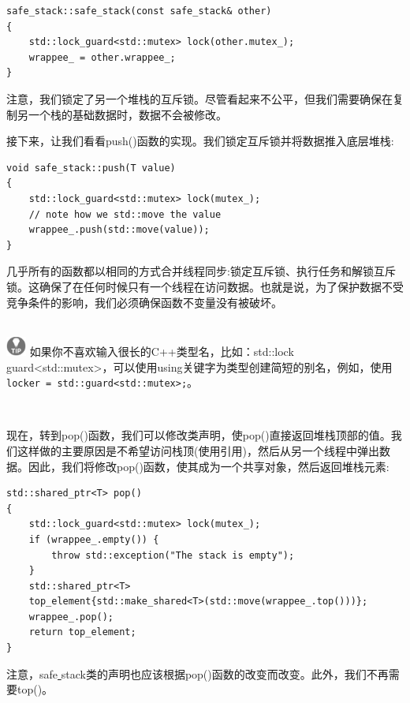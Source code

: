 \begin{lstlisting}[caption={}]
safe_stack::safe_stack(const safe_stack& other)
{
	std::lock_guard<std::mutex> lock(other.mutex_);
	wrappee_ = other.wrappee_;
}
\end{lstlisting}

注意，我们锁定了另一个堆栈的互斥锁。尽管看起来不公平，但我们需要确保在复制另一个栈的基础数据时，数据不会被修改。 \par
接下来，让我们看看push()函数的实现。我们锁定互斥锁并将数据推入底层堆栈: \par

\begin{lstlisting}[caption={}]
void safe_stack::push(T value)
{
	std::lock_guard<std::mutex> lock(mutex_);
	// note how we std::move the value
	wrappee_.push(std::move(value));
}
\end{lstlisting}

几乎所有的函数都以相同的方式合并线程同步:锁定互斥锁、执行任务和解锁互斥锁。这确保了在任何时候只有一个线程在访问数据。也就是说，为了保护数据不受竞争条件的影响，我们必须确保函数不变量没有被破坏。 \par

\hspace*{\fill} \\ %
\includegraphics[width=0.05\textwidth]{images/tip}
如果你不喜欢输入很长的C++类型名，比如：std::lock\underline{ }guard<std::mutex>，可以使用using关键字为类型创建简短的别名，例如，使用\texttt{locker = std::guard<std::mutex>;}。 \par
\noindent\textbf{}\ \par

现在，转到pop()函数，我们可以修改类声明，使pop()直接返回堆栈顶部的值。我们这样做的主要原因是不希望访问栈顶(使用引用)，然后从另一个线程中弹出数据。因此，我们将修改pop()函数，使其成为一个共享对象，然后返回堆栈元素: \par

\begin{lstlisting}[caption={}]
std::shared_ptr<T> pop()
{
	std::lock_guard<std::mutex> lock(mutex_);
	if (wrappee_.empty()) {
		throw std::exception("The stack is empty");
	}
	std::shared_ptr<T>
	top_element{std::make_shared<T>(std::move(wrappee_.top()))};
	wrappee_.pop();
	return top_element;
}
\end{lstlisting}

注意，safe\underline{ }stack类的声明也应该根据pop()函数的改变而改变。此外，我们不再需要top()。 \par

